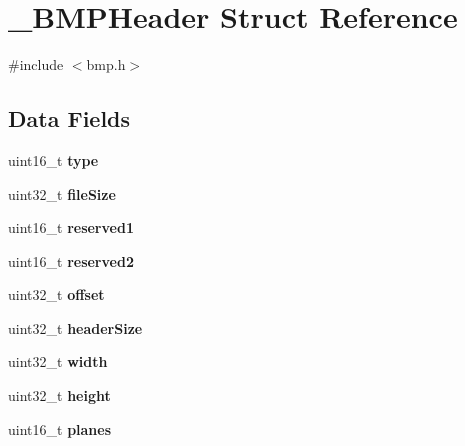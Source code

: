 \hypertarget{struct__BMPHeader}{}\section{\+\_\+\+B\+M\+P\+Header Struct Reference}
\label{struct__BMPHeader}


{\ttfamily \#include $<$bmp.\+h$>$}

\subsection*{Data Fields}
\begin{DoxyCompactItemize}
\item 
\mbox{\label{struct__BMPHeader_aa05022071262fbefdf704e786ec4be50}} 
uint16\+\_\+t {\bfseries type}
\item 
\mbox{\label{struct__BMPHeader_aa3cb1b6c9528ab4ea290359d308907c7}} 
uint32\+\_\+t {\bfseries file\+Size}
\item 
\mbox{\label{struct__BMPHeader_ae8d18107b751243794283ca006063043}} 
uint16\+\_\+t {\bfseries reserved1}
\item 
\mbox{\label{struct__BMPHeader_adee20b2bb8f4e5eb293c04eb9bf3711c}} 
uint16\+\_\+t {\bfseries reserved2}
\item 
\mbox{\label{struct__BMPHeader_a04607327b58a6bfb02a553637bfcc4aa}} 
uint32\+\_\+t {\bfseries offset}
\item 
\mbox{\label{struct__BMPHeader_a209e8afaa3672132db6fe0166b82b6a8}} 
uint32\+\_\+t {\bfseries header\+Size}
\item 
\mbox{\label{struct__BMPHeader_a1719b58cc57947326d1cc2237d1c2966}} 
uint32\+\_\+t {\bfseries width}
\item 
\mbox{\label{struct__BMPHeader_a42e47f7499353057029be60baa9a3f49}} 
uint32\+\_\+t {\bfseries height}
\item 
\mbox{\label{struct__BMPHeader_a696f22c72e7e3bee0fd23fcd078695e8}} 
uint16\+\_\+t {\bfseries planes}

\end{DoxyCompactItemize}
